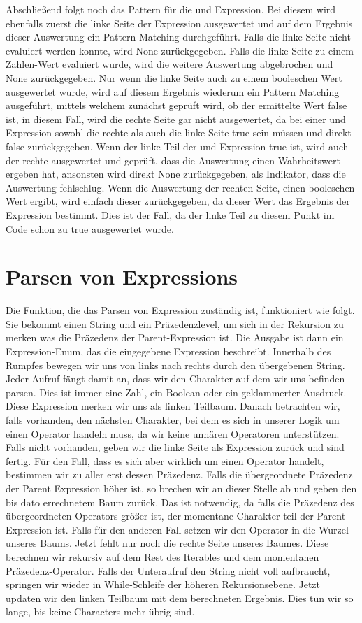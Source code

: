 \documentclass[a4paper, 1ppt]{article}
\begin{document}
Abschließend folgt noch das Pattern für die und Expression. Bei diesem wird ebenfalls zuerst die linke Seite der Expression ausgewertet und auf dem Ergebnis dieser Auswertung ein Pattern-Matching durchgeführt. Falls die linke Seite nicht evaluiert werden konnte, wird None zurückgegeben. Falls die linke Seite zu einem Zahlen-Wert evaluiert wurde, wird die weitere Auswertung abgebrochen und None zurückgegeben. Nur wenn die linke Seite auch zu einem booleschen Wert ausgewertet wurde, wird auf diesem Ergebnis wiederum ein Pattern Matching ausgeführt, mittels welchem zunächst geprüft wird, ob der ermittelte Wert false ist, in diesem Fall, wird die rechte Seite gar nicht ausgewertet, da bei einer und Expression sowohl die rechte als auch die linke Seite true sein müssen und direkt false zurückgegeben. Wenn der linke Teil der und Expression true ist, wird auch der rechte ausgewertet und geprüft, dass die Auswertung einen Wahrheitswert ergeben hat, ansonsten wird direkt None zurückgegeben, als Indikator, dass die Auswertung fehlschlug. Wenn die Auswertung der rechten Seite, einen booleschen Wert ergibt, wird einfach dieser zurückgegeben, da dieser Wert das Ergebnis der Expression bestimmt. Dies ist der Fall, da der linke Teil zu diesem Punkt im Code schon zu true ausgewertet wurde.
\section{Parsen von Expressions}
Die Funktion, die das Parsen von Expression zuständig ist, funktioniert wie folgt.
Sie bekommt einen String und ein Präzedenzlevel, um sich in der Rekursion zu merken
was die Präzedenz der Parent-Expression ist. Die Ausgabe ist dann ein Expression-Enum, das die eingegebene Expression beschreibt.
Innerhalb des Rumpfes bewegen wir uns von links nach rechts durch den übergebenen String.
Jeder Aufruf fängt damit an, dass wir den Charakter auf dem wir uns befinden parsen.
Dies ist immer eine Zahl, ein Boolean oder ein geklammerter Ausdruck. 
Diese Expression merken wir uns als linken Teilbaum.
Danach betrachten wir, falls vorhanden, den nächsten Charakter, bei dem es sich in unserer Logik um einen Operator handeln muss, 
da wir keine unnären Operatoren unterstützen. Falls nicht vorhanden, geben wir die linke Seite als Expression zurück und sind fertig.
Für den Fall, dass es sich aber wirklich um einen Operator handelt, bestimmen wir zu aller erst dessen Präzedenz.
Falls die übergeordnete Präzedenz der Parent Expression höher ist, so brechen wir an dieser Stelle ab und geben den bis dato errechnetem Baum zurück.
Das ist notwendig, da falls die Präzedenz des übergeordneten Operators größer ist, der momentane Charakter teil der Parent-Expression ist.
Falls für den anderen Fall setzen wir den Operator in die Wurzel unseres Baums. 
Jetzt fehlt nur noch die rechte Seite unseres Baumes.
Diese berechnen wir rekursiv auf dem Rest des Iterables und dem momentanen Präzedenz-Operator.
Falls der Unteraufruf den String nicht voll aufbraucht, springen wir wieder in While-Schleife der höheren Rekursionsebene.
Jetzt updaten wir den linken Teilbaum mit dem berechneten Ergebnis.
Dies tun wir so lange, bis keine Characters mehr übrig sind.
\end{document}
